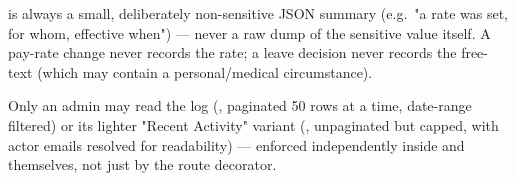  is always a small, deliberately non-sensitive JSON
summary (e.g.\ "a rate was set, for whom, effective when") --- never a
raw dump of the sensitive value itself. A pay-rate change never records
the rate; a leave decision never records the free-text
 (which may contain a personal/medical
circumstance).

Only an admin may read the log (, paginated 50 rows
at a time, date-range filtered) or its lighter "Recent Activity"
variant (, unpaginated but capped, with actor
emails resolved for readability) --- enforced independently inside
 and 
themselves, not just by the route decorator.
